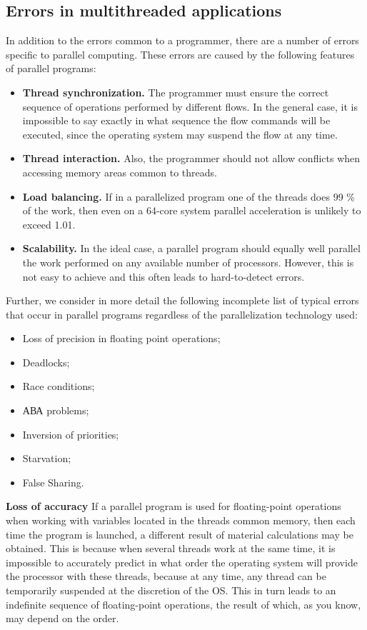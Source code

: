 { %
	\subsection{Errors in multithreaded applications}
	\par In addition to the errors common to a programmer, there are a number of errors specific to parallel computing. These errors are caused by the following features of parallel programs:
	\begin{itemize}
		\item\textbf{Thread synchronization.} The programmer must ensure the correct sequence of operations performed by different flows. In the general case, it is impossible to say exactly in what sequence the flow commands will be executed, since the operating system may suspend the flow at any time.
		\item\textbf{Thread interaction.} Also, the programmer should not allow conflicts when accessing memory areas common to threads.
		\item\textbf{Load balancing.} If in a parallelized program one of the threads does 99 \% of the work, then even on a 64-core system parallel acceleration is unlikely to exceed 1.01.
		\item\textbf{Scalability.} In the ideal case, a parallel program should equally well parallel the work performed on any available number of processors. However, this is not easy to achieve and this often leads to hard-to-detect errors.
	\end{itemize}
	\par Further, we consider in more detail the following incomplete list of typical errors that occur in parallel programs regardless of the parallelization technology used:
	\begin{itemize}
		\item Loss of precision in floating point operations;
		\item Deadlocks;
		\item Race conditions;
		\item АВА problems;
		\item Inversion of priorities;
		\item Starvation;
		\item False Sharing.
	\end{itemize}
	\par\textbf{Loss of accuracy} If a parallel program is used for floating-point operations when working with variables located in the threads common memory, then each time the program is launched, a different result of material calculations may be obtained. This is because when several threads work at the same time, it is impossible to accurately predict in what order the operating system will provide the processor with these threads, because at any time, any thread can be temporarily suspended at the discretion of the OS. This in turn leads to an indefinite sequence of floating-point operations, the result of which, as you know, may depend on the order.
}
